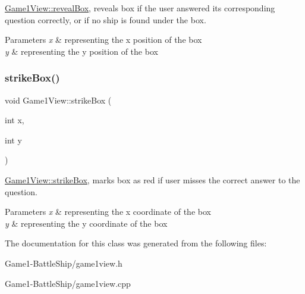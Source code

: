 \hyperlink{classGame1View_aa5ed1a0bd0034b87c20c649c3950a337}{Game1\+View\+::reveal\+Box}, reveals box if the user answered its corresponding question correctly, or if no ship is found under the box. 


\begin{DoxyParams}{Parameters}
{\em x} & representing the x position of the box \\
\hline
{\em y} & representing the y position of the box \\
\hline
\end{DoxyParams}
\mbox{\label{classGame1View_a0739a9638e33409f70bc1ab4337e3c83}} 
\subsubsection{\texorpdfstring{strike\+Box()}{strikeBox()}}
{\footnotesize\ttfamily void Game1\+View\+::strike\+Box (\begin{DoxyParamCaption}\item[{int}]{x,  }\item[{int}]{y }\end{DoxyParamCaption})}



\hyperlink{classGame1View_a0739a9638e33409f70bc1ab4337e3c83}{Game1\+View\+::strike\+Box}, marks box as red if user misses the correct answer to the question. 


\begin{DoxyParams}{Parameters}
{\em x} & representing the x coordinate of the box \\
\hline
{\em y} & representing the y coordinate of the box \\
\hline
\end{DoxyParams}


The documentation for this class was generated from the following files\+:\begin{DoxyCompactItemize}
\item 
Game1-\/\+Battle\+Ship/game1view.\+h\item 
Game1-\/\+Battle\+Ship/game1view.\+cpp\end{DoxyCompactItemize}
